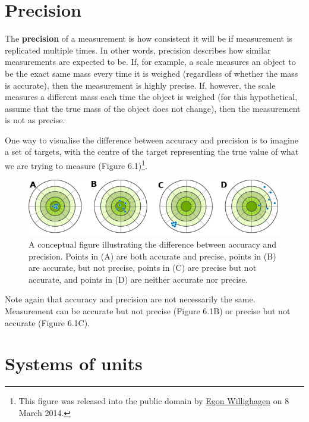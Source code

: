 \documentclass[
]{scrbook}
\begin{document}
\hypertarget{precision}{%
\section{Precision}\label{precision}}

The \textbf{precision} of a measurement is how consistent it will be if measurement is replicated multiple times.
In other words, precision describes how similar measurements are expected to be.
If, for example, a scale measures an object to be the exact same mass every time it is weighed (regardless of whether the mass is accurate), then the measurement is highly precise.
If, however, the scale measures a different mass each time the object is weighed (for this hypothetical, assume that the true mass of the object does not change), then the measurement is not as precise.

One way to visualise the difference between accuracy and precision is to imagine a set of targets, with the centre of the target representing the true value of what we are trying to measure (Figure 6.1)\footnote{This figure was released into the public domain by \href{https://commons.wikimedia.org/wiki/File:Accuracy-vs-precision-nl.svg}{Egon Willighagen} on 8 March 2014.}.

\begin{figure}
\includegraphics[width=1\linewidth]{img/accuracy_vs_precision} \caption{A conceptual figure illustrating the difference between accuracy and precision. Points in (A) are both accurate and precise, points in (B) are accurate, but not precise, points in (C) are precise but not accurate, and points in (D) are neither accurate nor precise.}\label{fig:unnamed-chunk-22}
\end{figure}

Note again that accuracy and precision are not necessarily the same.
Measurement can be accurate but not precise (Figure 6.1B) or precise but not accurate (Figure 6.1C).

\hypertarget{systems-of-units}{%
\section{Systems of units}\label{systems-of-units}}
\end{document}
